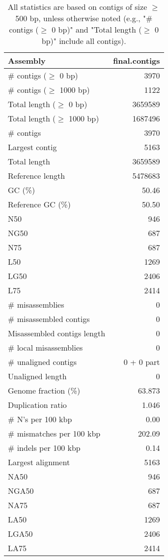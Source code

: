 \documentclass[12pt,a4paper]{article}
\begin{document}
\begin{table}[ht]
\begin{center}
\caption{All statistics are based on contigs of size $\geq$ 500 bp, unless otherwise noted (e.g., "\# contigs ($\geq$ 0 bp)" and "Total length ($\geq$ 0 bp)" include all contigs).}
\begin{tabular}{|l*{1}{|r}|}
\hline
Assembly & final.contigs \\ \hline
\# contigs ($\geq$ 0 bp) & 3970 \\ \hline
\# contigs ($\geq$ 1000 bp) & 1122 \\ \hline
Total length ($\geq$ 0 bp) & 3659589 \\ \hline
Total length ($\geq$ 1000 bp) & 1687496 \\ \hline
\# contigs & 3970 \\ \hline
Largest contig & 5163 \\ \hline
Total length & 3659589 \\ \hline
Reference length & 5478683 \\ \hline
GC (\%) & 50.46 \\ \hline
Reference GC (\%) & 50.50 \\ \hline
N50 & 946 \\ \hline
NG50 & 687 \\ \hline
N75 & 687 \\ \hline
L50 & 1269 \\ \hline
LG50 & 2406 \\ \hline
L75 & 2414 \\ \hline
\# misassemblies & 0 \\ \hline
\# misassembled contigs & 0 \\ \hline
Misassembled contigs length & 0 \\ \hline
\# local misassemblies & 0 \\ \hline
\# unaligned contigs & 0 + 0 part \\ \hline
Unaligned length & 0 \\ \hline
Genome fraction (\%) & 63.873 \\ \hline
Duplication ratio & 1.046 \\ \hline
\# N's per 100 kbp & 0.00 \\ \hline
\# mismatches per 100 kbp & 202.09 \\ \hline
\# indels per 100 kbp & 0.14 \\ \hline
Largest alignment & 5163 \\ \hline
NA50 & 946 \\ \hline
NGA50 & 687 \\ \hline
NA75 & 687 \\ \hline
LA50 & 1269 \\ \hline
LGA50 & 2406 \\ \hline
LA75 & 2414 \\ \hline
\end{tabular}
\end{center}
\end{table}
\end{document}
